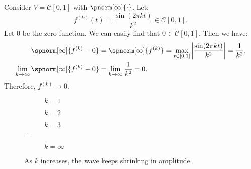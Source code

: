 \documentclass{huhtakm-template-book-v2}
\begin{document}
    \begin{eg}
        Consider $V = \mathcal{C}[0, 1]$ with $\pnorm[\infty]{\cdot}$. Let:
        \begin{equation*}
            f^{(k)}(t) = \frac{\sin(2\pi kt)}{k^{2}} \in \mathcal{C}[0, 1].
        \end{equation*}
        Let $0$ be the zero function. We can easily find that $0 \in \mathcal{C}[0, 1]$. Then we have:
        \begin{align*}
            \spnorm[\infty]{f^{(k)} - 0} &= \spnorm[\infty]{f^{(k)}} = \max_{t \in [0, 1]}\abs{\frac{\sin(2\pi kt)}{k^{2}}} = \frac{1}{k^{2}},\\
            \lim_{k \to \infty}\spnorm[\infty]{f^{(k)} - 0} &= \lim_{k \to \infty}\frac{1}{k^{2}} = 0.
        \end{align*}
        Therefore, $f^{(k)} \to 0$.
    \end{eg}
    \begin{figure}[h]
        \centering
        \begin{subfigure}[h]{0.2\textwidth}
            \centering
            
            $k = 1$
        \end{subfigure}
        \begin{subfigure}[h]{0.2\textwidth}
            \centering
            
            $k = 2$
        \end{subfigure}
        \begin{subfigure}[h]{0.2\textwidth}
            \centering
            
            $k = 3$
        \end{subfigure}
        $\cdots$
        \begin{subfigure}[h]{0.2\textwidth}
            \centering
            
            $k = \infty$
        \end{subfigure}
        \caption{As $k$ increases, the wave keeps shrinking in amplitude.}
    \end{figure}
    \newpage
\end{document}
